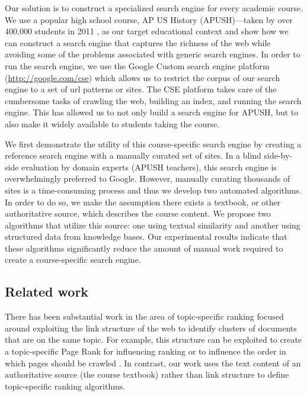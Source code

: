 \documentclass[pdfpagelabels=false,plainpages=true]{acm_proc_article-sp}
\begin{document}
Our solution is to construct a specialized search engine for every academic
course. We use a popular high school course, AP US History (APUSH)---taken by
over 400,000 students in 2011 \cite{wikipedia}, as 
our target educational context and show how we can construct a search engine
that captures the 
richness of the web while avoiding some of the problems associated with generic
search engines. In order to run the search engine, we use the Google Custom
search engine platform  (\url{http://google.com/cse}) which allows us to
restrict the corpus of our search engine to a set of url patterns or sites. The
CSE platform takes care of the cumbersome tasks of crawling the web, building an
index, and running the search engine. This has allowed us to not only build a
search engine for APUSH, but to also make it widely available to students taking
the course.     

We first demonstrate the utility of this course-specific search engine by creating
a reference search engine with a manually curated set of sites. In a
blind side-by-side evaluation by domain experts (APUSH teachers), this search
engine is overwhelmingly preferred to Google. However, manually curating
thousands of sites is a time-consuming process and thus we develop two
automated algorithms. In order to do so, we make the assumption there exists a
textbook, or other authoritative source, which describes the course content.
We propose two algorithms that utilize this source: one using textual similarity and
another using structured data from knowledge bases. Our experimental results
indicate that these algorithms significantly reduce the amount of manual work
required to create a course-specific search engine.

\subsection{Related work}

There has been substantial work in the area of topic-specific ranking focused
around exploiting the link structure of the web to identify clusters of
documents that are on the same topic. For example, this structure can be
exploited to create a topic-specific Page Rank for influencing ranking
\cite{haveliwala2003topic, hsu2006topic} or to influence the order in which
pages should be crawled \cite{buntine2004scalable}. In contrast, our work uses the
text content of an authoritative source (the course textbook) rather than link
structure to define topic-specific ranking algorithms.
\end{document}
